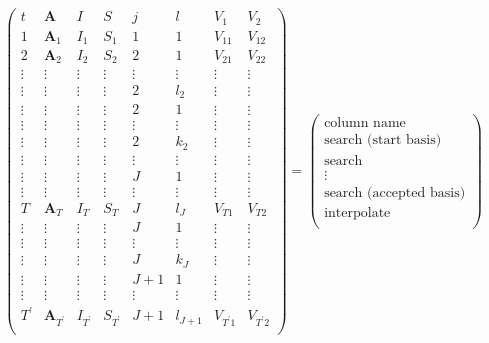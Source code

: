 \begin{equation}
\renewcommand\arraystretch{2}  %
\begin{pmatrix}
t & \mathbf{A} & I & S & j &  l  & V_{1} & V_{2}\\
\hline
1 & \mathbf{A}_1 & I_1 & S_1 & 1 & 1 & V_{11} & V_{12}\\
\hline
2 & \mathbf{A}_2 & I_2 & S_2 & 2 & 1  & V_{21}  & V_{22}\\
\vdots & \vdots &\vdots &\vdots  &\vdots & \vdots &\vdots  &\vdots\\
\vdots & \vdots & \vdots &\vdots & 2 & l_2 & \vdots  & \vdots\\
\hline
\vdots &\vdots & \vdots &\vdots & 2  & 1& \vdots & \vdots\\
\vdots &\vdots &\vdots &\vdots &\vdots & \vdots & \vdots  &\vdots \\
\vdots &\vdots &\vdots &\vdots & 2 & k_2 &\vdots  & \vdots\\
\hline
\vdots &\vdots &\vdots &\vdots &\vdots & \vdots &\vdots &\vdots \\
\hline
\vdots & \vdots & \vdots &\vdots  & J &  1 & \vdots & \vdots \\
\vdots &\vdots &\vdots &\vdots &\vdots & \vdots &\vdots &\vdots \\
T & \mathbf{A}_T & I_T &S_T  & J &  l_{J} & V_{T1}& V_{T2}\\
\hline
\vdots &\vdots & \vdots &\vdots & J  & 1& \vdots & \vdots\\
\vdots &\vdots &\vdots &\vdots &\vdots & \vdots & \vdots  &\vdots \\
\vdots &\vdots &\vdots &\vdots & J & k_J &\vdots  & \vdots\\
\hline
\vdots& \vdots & \vdots & \vdots & J+1 & 1 & \vdots& \vdots\\
\vdots &\vdots &\vdots &\vdots &\vdots & \vdots &\vdots &\vdots \\
T^\prime & \mathbf{A}_{T^\prime} & I_{T^\prime} &S_{T^\prime}  & J+1 &  l_{J+1} & V_{T^\prime 1}& V_{T^\prime 2}\\
\end{pmatrix}
= 
\begin{pmatrix}
\text{column name} \\
\hline
\text{search (start basis)} \\
\hline
\text{search} \\
\vdots \\
\text{search (accepted basis)} \\
\hline
\text{interpolate} \\

\end{pmatrix}
\end{equation}
